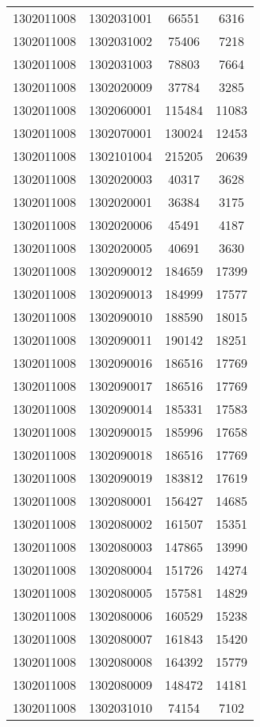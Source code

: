 \begin{longtable}[h]{llcc}
		1302011008 & 1302031001 & 66551 & 6316\\
		1302011008 & 1302031002 & 75406 & 7218\\
		1302011008 & 1302031003 & 78803 & 7664\\
		1302011008 & 1302020009 & 37784 & 3285\\
		1302011008 & 1302060001 & 115484 & 11083\\
		1302011008 & 1302070001 & 130024 & 12453\\
		1302011008 & 1302101004 & 215205 & 20639\\
		1302011008 & 1302020003 & 40317 & 3628\\
		1302011008 & 1302020001 & 36384 & 3175\\
		1302011008 & 1302020006 & 45491 & 4187\\
		1302011008 & 1302020005 & 40691 & 3630\\
		1302011008 & 1302090012 & 184659 & 17399\\
		1302011008 & 1302090013 & 184999 & 17577\\
		1302011008 & 1302090010 & 188590 & 18015\\
		1302011008 & 1302090011 & 190142 & 18251\\
		1302011008 & 1302090016 & 186516 & 17769\\
		1302011008 & 1302090017 & 186516 & 17769\\
		1302011008 & 1302090014 & 185331 & 17583\\
		1302011008 & 1302090015 & 185996 & 17658\\
		1302011008 & 1302090018 & 186516 & 17769\\
		1302011008 & 1302090019 & 183812 & 17619\\
		1302011008 & 1302080001 & 156427 & 14685\\
		1302011008 & 1302080002 & 161507 & 15351\\
		1302011008 & 1302080003 & 147865 & 13990\\
		1302011008 & 1302080004 & 151726 & 14274\\
		1302011008 & 1302080005 & 157581 & 14829\\
		1302011008 & 1302080006 & 160529 & 15238\\
		1302011008 & 1302080007 & 161843 & 15420\\
		1302011008 & 1302080008 & 164392 & 15779\\
		1302011008 & 1302080009 & 148472 & 14181\\
		1302011008 & 1302031010 & 74154 & 7102\\

\end{longtable}
